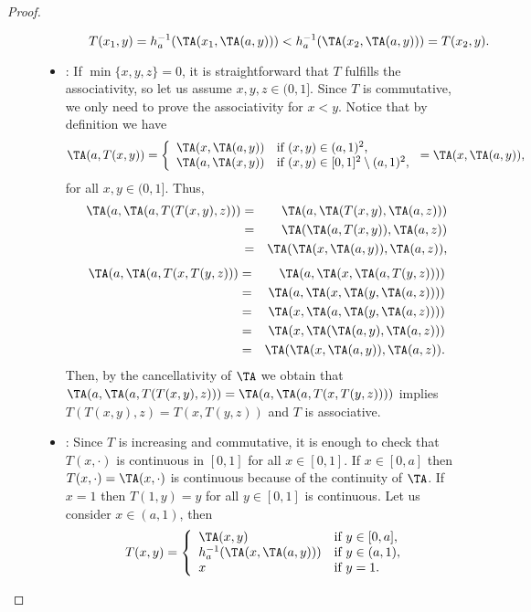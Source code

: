 \begin{proof}
\begin{description}
\begin{itemize}
\begin{itemize}
				$$T(x_1,y)=h_a^{-1}(\TA(x_1,\TA(a,y))) < h_a^{-1}(\TA(x_2,\TA(a,y))) = T(x_2,y).$$
			\end{itemize}
			\item \underline{}: If $\min \{x,y,z\}=0$, it is straightforward that $T$ fulfills the associativity, so let us assume $x,y,z \in (0,1]$. Since $T$ is commutative, we only need to prove the associativity for $x<y$. Notice that by definition we have
			$$
			\TA(a,T(x,y))
			=
			\left\{ \begin{array}{ll}
				\TA(x,\TA(a,y)) & \text{if } (x,y) \in (a,1)^2,\\
				\TA(a,\TA(x,y)) &   \text{if }   (x,y) \in [0,1]^2 \setminus (a,1)^2,
			\end{array} \right.
			=\TA(x,\TA(a,y)),
			$$
			for all $x,y \in (0,1]$. Thus,
			\begin{eqnarray*}
				\TA(a,\TA(a,T(T(x,y),z))) &=& \TA(a,\TA(T(x,y),\TA(a,z)))\\ 
										  &=& \TA(\TA(a,T(x,y)),\TA(a,z))\\
										  &=& \TA(\TA(x,\TA(a,y)),\TA(a,z)),
			\end{eqnarray*}
			\begin{eqnarray*}
				\TA(a,\TA(a,T(x,T(y,z))) &=& \TA(a,\TA(x,\TA(a,T(y,z))))\\ 
				&=& \TA(a,\TA(x,\TA(y,\TA(a,z))))\\
				&=& \TA(x,\TA(a,\TA(y,\TA(a,z))))\\
				&=& \TA(x,\TA(\TA(a,y),\TA(a,z)))\\
				&=& \TA(\TA(x,\TA(a,y)),\TA(a,z)).
			\end{eqnarray*}
			Then, by the cancellativity of $\TA$ we obtain that $\TA(a,\TA(a,T(T(x,y),z)))= \TA(a,\TA(a,T(x,T(y,z))))$ implies $T(T(x,y),z)=T(x,T(y,z))$ and $T$ is associative.
			\item \underline{}: Since $T$ is increasing and commutative, it is enough to check that $T(x,\cdot)$ is continuous in $[0,1]$ for all $x \in [0,1]$. If $x \in [0,a]$ then $T(x,\cdot)=\TA(x,\cdot)$ is continuous because of the continuity of $\TA$. If $x=1$ then $T(1,y)=y$ for all $y \in [0,1]$ is continuous. Let us consider $x \in (a,1)$, then
			$$
			T(x,y)
			=
			\left\{ \begin{array}{ll}
				\TA(x,y) & \text{if } y \in [0,a],\\
				h_a^{-1}(\TA(x,\TA(a,y))) &   \text{if }   y \in (a,1),\\
				x & \text{if } y=1.
			\end{array} \right.
$$
\end{itemize}
\end{description}
\end{proof}
